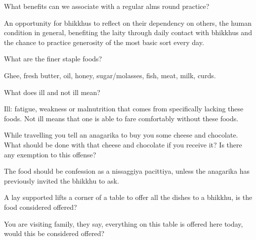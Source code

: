 \bigskip

What benefits can we associate with a regular alms round practice?

\begin{solution}
  An opportunity for bhikkhus to reflect on their dependency on others, the
  human condition in general, benefiting the laity through daily contact with
  bhikkhus and the chance to practice generosity of the most basic sort every
  day.
\end{solution}

\bigskip

What are the finer staple foods?

\begin{solution}
  Ghee, fresh butter, oil, honey, sugar/molasses, fish, meat, milk, curds.
\end{solution}

\bigskip

What does ill and not ill mean?

\begin{solution}
  Ill: fatigue, weakness or malnutrition that comes from specifically lacking
  these foods. Not ill means that one is able to fare comfortably without these
  foods.
\end{solution}

\bigskip

While travelling you tell an anagarika to buy you some cheese and chocolate.
What should be done with that cheese and chocolate if you receive it? Is there
any exemption to this offense?

\begin{solution}
  The food should be confession as a nissaggiya pacittiya, unless the
  anagarika has previously invited the bhikkhu to ask.
\end{solution}

\bigskip


A lay supported lifts a corner of a table to offer all the dishes to a bhikkhu,
is the food considered offered?

\bigskip

You are visiting family, they say, everything on this table is offered here
today, would this be considered offered?

\bigskip

